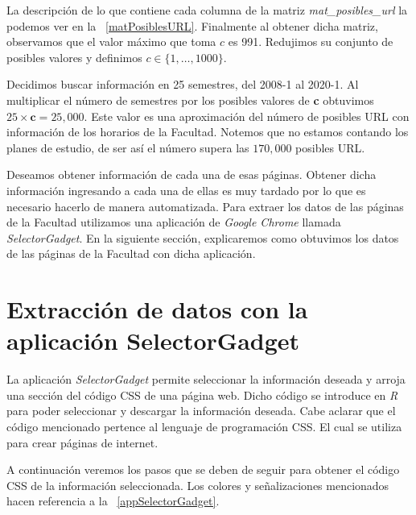 La descripción de lo que contiene cada columna de la matriz \textit{mat\_posibles\_url} la podemos ver en la \tablename{~\ref{matPosiblesURL}}. Finalmente al obtener dicha matriz, observamos que el valor máximo que toma $c$ es 991. Redujimos su conjunto de posibles valores y definimos $c \in \{1, \ldots, 1 000\}$.

\dfNmatrizChica %

Decidimos buscar información en 25 semestres, del 2008-1 al 2020-1. Al multiplicar el número de semestres por los posibles valores de \textbf{c} obtuvimos $25 \times \textbf{c} = 25,000$. Este valor es una aproximación del número de posibles URL con información de los horarios de la Facultad. Notemos que no estamos contando los planes de estudio, de ser así el número supera las $170,000$ posibles URL.

Deseamos obtener información de cada una de esas páginas. Obtener dicha información ingresando a cada una de ellas es muy tardado por lo que es necesario hacerlo de manera automatizada. Para extraer los datos de las páginas de la Facultad utilizamos una aplicación de \textit{Google Chrome} llamada \textit{SelectorGadget}. En la siguiente sección, explicaremos como obtuvimos los datos de las páginas de la Facultad con dicha aplicación.

\section{Extracción de datos con la aplicación SelectorGadget} \label{sec_ED_SelectorGadget}

La aplicación \textit{SelectorGadget} permite seleccionar la información deseada y arroja una sección del código CSS de una página web. Dicho código se introduce en \textit{R} para poder seleccionar y descargar la información deseada. Cabe aclarar que el código mencionado pertence al lenguaje de programación CSS. El cual se utiliza para crear páginas de internet.

A continuación veremos los pasos que se deben de seguir para obtener el código CSS de la información seleccionada. Los colores y señalizaciones mencionados hacen referencia a la \figurename{~\ref{appSelectorGadget}}. %

